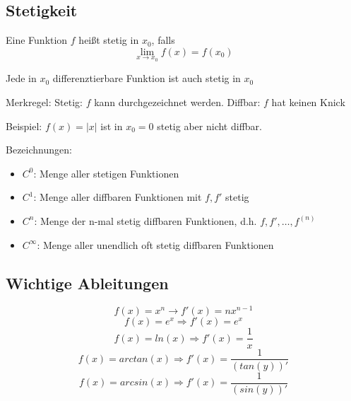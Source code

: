   \subsection{Stetigkeit}
  \begin{definition}
    Eine Funktion $f$ heißt stetig in $x_0$, falls 
    \begin{equation}
      \lim_{x \rightarrow x_0} f(x) = f(x_0)
    \end{equation}
  \end{definition}
  \begin{satz}
    Jede in $x_0$ differenztierbare Funktion ist auch stetig in $x_0$  
  \end{satz}
  \begin{bem}
    Merkregel:\newline
    Stetig: $f$ kann durchgezeichnet werden.\newline
    Diffbar: $f$ hat keinen Knick
  \end{bem}
  Beispiel:\newline
  $f(x) = |x|$ ist in $x_0 = 0$ stetig aber nicht diffbar.
  \begin{bem}
    Bezeichnungen:
    \begin{itemize}
      \item $C^0$: Menge aller stetigen Funktionen
      \item $C^1$: Menge aller diffbaren Funktionen mit $f,f'$ stetig
      \item $C^n$: Menge der n-mal stetig diffbaren Funktionen, d.h. $f, f', \dots, f^{(n)}$
      \item $C^{\infty}$: Menge aller unendlich oft stetig diffbaren Funktionen
    \end{itemize}
  \end{bem}
  \subsection{Wichtige Ableitungen}
  \begin{equation}
    f(x) = x^n \rightarrow f'(x) = nx^{n-1}
  \end{equation}
  \begin{equation}
    f(x) = e^x \Rightarrow f'(x) = e^x
  \end{equation}
  \begin{equation}
    f(x) = ln(x) \Rightarrow f'(x) = \frac{1}{x}
  \end{equation}
  \begin{equation}
    f(x) = arctan(x) \Rightarrow f'(x) = \frac{1}{(tan(y))'}
  \end{equation}
  \begin{equation}
    f(x) = arcsin(x) \Rightarrow f'(x) = \frac{1}{(sin(y))'}
  \end{equation}

